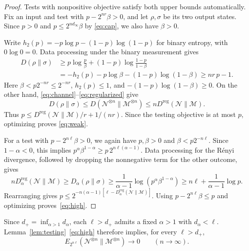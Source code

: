 \documentclass[11pt,letterpaper]{article}
\numberwithin{equation}{section}
\newcommand{\N}{\mathcal N}
\newcommand{\M}{\mathcal M}
\newcommand{\reg}{\mathrm{reg}}
\newcommand{\Dt}{D}
\begin{document}
\begin{proof}
Tests with nonpositive objective satisfy both upper bounds automatically. Fix an input and test with $p-2^{nr}\beta>0$, and let $\rho,\sigma$ be its two output states. Since $p>0$ and $p\le2^{n d_\infty}\beta$ by \eqref{eq:cap}, we also have $\beta>0$.

Write $h_2(p)=-p\log p-(1-p)\log(1-p)$ for binary entropy, with $0\log0=0$. Data processing under the binary measurement gives
\begin{align*}
 D(\rho\|\sigma)
 &\ge p\log\frac p\beta+(1-p)\log\frac{1-p}{1-\beta}\\
 &=-h_2(p)-p\log\beta-(1-p)\log(1-\beta)
 \ge nr\,p-1.
\end{align*}
Here $\beta<p2^{-nr}\le2^{-nr}$, $h_2(p)\le1$, and $-(1-p)\log(1-\beta)\ge0$. On the other hand, \eqref{eq:channel}--\eqref{eq:regularized} give
\[
 D(\rho\|\sigma)\le D(\N^{\otimes n}\|\M^{\otimes n})\le nD^{\reg}(\N\|\M).
\]
Thus $p\le D^{\reg}(\N\|\M)/r+1/(nr)$. Since the testing objective is at most $p$, optimizing proves \eqref{eq:weak}.

For a test with $p-2^{n\ell}\beta>0$, we again have $p,\beta>0$ and $\beta<p2^{-n\ell}$. Since $1-\alpha<0$, this implies $p^\alpha\beta^{1-\alpha}\ge p\,2^{n\ell(\alpha-1)}$. Data processing for the R\'enyi divergence, followed by dropping the nonnegative term for the other outcome, gives
\[
 n\Dt_\alpha^{\reg}(\N\|\M)
 \ge\Dt_\alpha(\rho\|\sigma)
 \ge\frac1{\alpha-1}\log(p^\alpha\beta^{1-\alpha})
 \ge n\ell+\frac1{\alpha-1}\log p.
\]
Rearranging gives $p\le2^{-n(\alpha-1)[\ell-\Dt_\alpha^{\reg}(\N\|\M)]}$. Using $p-2^{n\ell}\beta\le p$ and optimizing proves~\eqref{eq:high}.
\end{proof}

Since $d_+=\inf_{\alpha>1}d_\alpha$, each $\ell>d_+$ admits a fixed $\alpha>1$ with $d_\alpha<\ell$. Lemma~\ref{lem:testing}~\eqref{eq:high} therefore implies, for every $\ell>d_+$,
\begin{equation}\label{eq:highvanishing}
 E_{2^{n\ell}}(\N^{\otimes n}\|\M^{\otimes n})\longrightarrow0
 \qquad(n\to\infty).
\end{equation}
\end{document}
